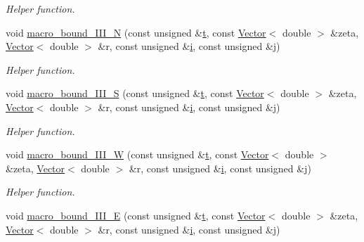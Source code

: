 \begin{DoxyCompactItemize}
\begin{DoxyCompactList}\small\item\em Helper function. \end{DoxyCompactList}\item 
void \hyperlink{classoomph_1_1ChannelWithLeafletDomain_a8b7f88fb218ceb09f0fde09ba22cd5b9}{macro\+\_\+bound\+\_\+\+I\+I\+I\+\_\+N} (const unsigned \&\hyperlink{cfortran_8h_af6f0bd3dc13317f895c91323c25c2b8f}{t}, const \hyperlink{classoomph_1_1Vector}{Vector}$<$ double $>$ \&zeta, \hyperlink{classoomph_1_1Vector}{Vector}$<$ double $>$ \&r, const unsigned \&\hyperlink{cfortran_8h_adb50e893b86b3e55e751a42eab3cba82}{i}, const unsigned \&j)
\begin{DoxyCompactList}\small\item\em Helper function. \end{DoxyCompactList}\item 
void \hyperlink{classoomph_1_1ChannelWithLeafletDomain_aacdeafe878caadb3e6d0cf98a87df25a}{macro\+\_\+bound\+\_\+\+I\+I\+I\+\_\+S} (const unsigned \&\hyperlink{cfortran_8h_af6f0bd3dc13317f895c91323c25c2b8f}{t}, const \hyperlink{classoomph_1_1Vector}{Vector}$<$ double $>$ \&zeta, \hyperlink{classoomph_1_1Vector}{Vector}$<$ double $>$ \&r, const unsigned \&\hyperlink{cfortran_8h_adb50e893b86b3e55e751a42eab3cba82}{i}, const unsigned \&j)
\begin{DoxyCompactList}\small\item\em Helper function. \end{DoxyCompactList}\item 
void \hyperlink{classoomph_1_1ChannelWithLeafletDomain_a06ccb5b6d160c3a31acf80174381a834}{macro\+\_\+bound\+\_\+\+I\+I\+I\+\_\+W} (const unsigned \&\hyperlink{cfortran_8h_af6f0bd3dc13317f895c91323c25c2b8f}{t}, const \hyperlink{classoomph_1_1Vector}{Vector}$<$ double $>$ \&zeta, \hyperlink{classoomph_1_1Vector}{Vector}$<$ double $>$ \&r, const unsigned \&\hyperlink{cfortran_8h_adb50e893b86b3e55e751a42eab3cba82}{i}, const unsigned \&j)
\begin{DoxyCompactList}\small\item\em Helper function. \end{DoxyCompactList}\item 
void \hyperlink{classoomph_1_1ChannelWithLeafletDomain_af17451c66c723d841aa6f16505c51be3}{macro\+\_\+bound\+\_\+\+I\+I\+I\+\_\+E} (const unsigned \&\hyperlink{cfortran_8h_af6f0bd3dc13317f895c91323c25c2b8f}{t}, const \hyperlink{classoomph_1_1Vector}{Vector}$<$ double $>$ \&zeta, \hyperlink{classoomph_1_1Vector}{Vector}$<$ double $>$ \&r, const unsigned \&\hyperlink{cfortran_8h_adb50e893b86b3e55e751a42eab3cba82}{i}, const unsigned \&j)

\end{DoxyCompactItemize}
